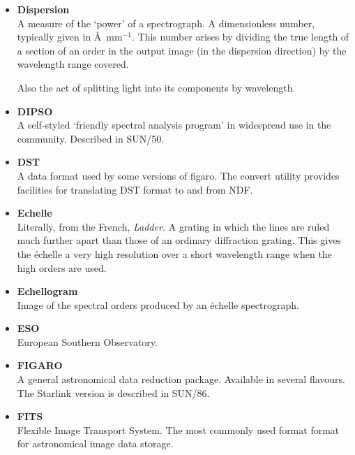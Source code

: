 \documentclass[twoside,11pt]{article}
\newcommand{\htmladdnormallink}[2]{#1}
\newcommand{\htmlref}[2]{#1}
\newcommand{\xref}[3]{#1}
\begin{document}
\begin{itemize}
\item {\bf\label{gl_dispersion}Dispersion}\\
      A measure of the `power' of a spectrograph. A dimensionless number,
      typically given in \AA\ mm${}^{-1}$.  This number arises by dividing
      the true
      length of a section of an order in the output image (in the
      dispersion direction) by the wavelength range covered.

      Also the act of splitting light into its components by wavelength.

\item {\bf\label{gl_dipso}DIPSO}\\
      A self-styled `friendly spectral analysis program' in
      widespread use in the community.  Described in
      \xref{SUN/50}{sun50}{}.

\item {\bf\label{gl_dst}DST}\\
      A data format used by some versions of \xref{{\sc figaro}}{sun86}{}.
      The \xref{{\sc convert}}{sun55}{} utility provides facilities for
      translating DST format to and from \htmlref{NDF}{gl_ndf}.

\item {\bf\label{gl_echelle}Echelle}\\
      Literally, from the French, {\sl Ladder.}
      A \htmlref{grating}{gl_grating} in which the
      lines are ruled much further apart than those of an ordinary
      diffraction grating.  This gives the \'{e}chelle a very high
      resolution over a short wavelength range when the high orders are
      used.

\item {\bf\label{gl_echellogram}Echellogram}\\
      Image of the spectral orders produced by an
      \htmlref{\'{e}chelle}{gl_echelle}
      \htmlref{spectrograph}{gl_spectrograph}.

\item {\bf\label{gl_eso}ESO}\\
      \htmladdnormallink{European Southern Observatory}
      {http://http.hq.eso.org/}.

\item {\bf\label{gl_figaro}FIGARO}\\
      A general astronomical data reduction package.  Available in
      several flavours.  The Starlink version is described in
      \xref{SUN/86}{sun86}{}.

\item {\bf\label{gl_fits}FITS}\\
      Flexible Image Transport System.  The most commonly used format
      format for astronomical image data storage.


\end{itemize}
\end{document}
